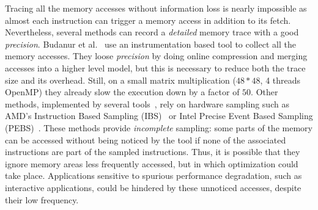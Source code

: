 Tracing all the memory accesses without information loss is nearly impossible as
almost each instruction can trigger a memory access in addition to its fetch. Nevertheless, several methods
can record a \emph{detailed} memory trace with a good \emph{precision}.
%
Budanur et al.~\cite{Budanur11Memory} use an instrumentation based tool to
collect all the memory accesses. They loose \emph{precision} by doing online compression and merging accesses
into a higher level model, but this is necessary to reduce both the trace size and its overhead.
Still, on a small matrix multiplication ($48*48$, 4 threads OpenMP) they already
slow the execution down by a factor of $50$.
Other methods, implemented by several
tools~\cite{Lachaize12MemProf,McCurdy10Memphis,Liu14Tool,Gimenez14Dissecting},
rely on hardware sampling such as AMD's Instruction Based Sampling
(IBS)~\cite{Drongowski07Instructionbased} or Intel Precise Event Based
Sampling (PEBS)~\cite{Levinthal09Performance}.  These methods provide \emph{incomplete}
sampling: some parts of the memory can be accessed without being noticed by
the tool if none of the associated instructions are part of the sampled
instructions.  Thus, it is possible that they ignore memory areas
less frequently accessed, but in which optimization could take place.
Applications sensitive to spurious performance
degradation, such as interactive applications, could be hindered by these
unnoticed accesses, despite their low frequency.
%
%

